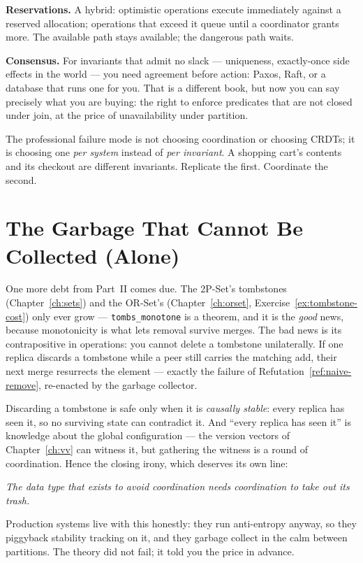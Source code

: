 \documentclass[12pt, a4paper, openright]{book}
\theoremstyle{thmstyle}
\theoremstyle{defstyle}
\newcommand{\lc}[1]{\texttt{#1}}
\begin{document}
\textbf{Reservations.} A hybrid: optimistic operations execute
immediately against a reserved allocation; operations that exceed it
queue until a coordinator grants more. The available path stays
available; the dangerous path waits.

\textbf{Consensus.} For invariants that admit no slack --- uniqueness,
exactly-once side effects in the world --- you need agreement before
action: Paxos, Raft, or a database that runs one for you. That is a
different book, but now you can say precisely what you are buying: the
right to enforce predicates that are not closed under join, at the price
of unavailability under partition.

The professional failure mode is not choosing coordination or choosing
CRDTs; it is choosing one \emph{per system} instead of \emph{per
invariant}. A shopping cart's contents and its checkout are different
invariants. Replicate the first. Coordinate the second.

\section{The Garbage That Cannot Be Collected (Alone)}

One more debt from Part~II comes due. The 2P-Set's tombstones
(Chapter~\ref{ch:sets}) and the OR-Set's
(Chapter~\ref{ch:orset}, Exercise~\ref{ex:tombstone-cost})
only ever grow --- \lc{tombs_monotone} is a theorem, and it is the
\emph{good} news, because monotonicity is what lets removal survive
merges. The bad news is its contrapositive in operations: you cannot
delete a tombstone unilaterally. If one replica discards a tombstone
while a peer still carries the matching add, their next merge resurrects
the element --- exactly the failure of
Refutation~\ref{ref:naive-remove}, re-enacted by the garbage
collector.

Discarding a tombstone is safe only when it is \emph{causally stable}:
every replica has seen it, so no surviving state can contradict it. And
``every replica has seen it'' is knowledge about the global
configuration --- the version vectors of Chapter~\ref{ch:vv} can
witness it, but gathering the witness is a round of coordination.
Hence the closing irony, which deserves its own line:

\emph{The data type that exists to avoid coordination needs
coordination to take out its trash.}

Production systems live with this honestly: they run anti-entropy
anyway, so they piggyback stability tracking on it, and they garbage
collect in the calm between partitions. The theory did not fail; it
told you the price in advance.
\end{document}
